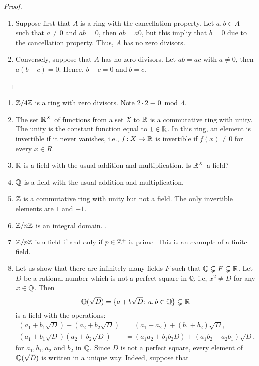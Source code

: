 \documentclass[11pt,a4paper]{article}
\begin{document}
\begin{proof}
\begin{enumerate}[label=(\roman*)]
\item Suppose first that $A$ is a ring with the cancellation property. Let $a,b\in A$ such that $a\neq 0$ and $ab=0$, then $ab=a0$, but this impliy that $b=0$ due to the cancellation property. Thus, $A$ has no zero divisors.
\item Conversely, suppose that $A$ has no zero divisors. Let $ab=ac$ with $a\neq0$, then $a(b-c)=0$. Hence, $b-c=0$ and $b=c$.
\end{enumerate}
\end{proof}
  

\begin{exa}
\begin{enumerate}[label=(\roman*)]
\item \(\mathbb{Z}/4\mathbb{Z}\) is a ring with zero divisors. Note  \(2\cdot 2 \equiv 0 \bmod 4 \). 
\item The set \(\mathbb{R}^X\) of   functions from a set \(X\) to \(\mathbb{R}\) is a commutative ring with unity. The unity is the constant function equal to \(1\in \mathbb{R}\). In this ring, an element is invertible if it never vanishes, i.e., \(f\colon X\to\mathbb{R}\) is invertible if \(f(x)\neq 0\) for every \(x\in R\).
\item \(\mathbb{R}\) is a field with the usual addition and multiplication. Is \(\mathbb{R}^X\) a field?
\item \(\mathbb{Q}\) is a field with the usual addition and multiplication.
\item \(\mathbb{Z}\) is a commutative ring with unity but not a field. The only invertible elements are $1$ and $-1$.
\item \(\mathbb{Z}/n\mathbb{Z}\) is an integral domain. .
\item \(\mathbb{Z}/p\mathbb{Z}\) is a field if and only if \(p\in \mathbb{Z}^+\) is prime. This is an example of a finite field. 
\item Let us show that there are infinitely many  fields \(F\) such that \(\mathbb{Q}\subsetneq F\subsetneq \mathbb{R}\). Let $D$ be a rational number which is not a perfect square in $\mathbb{Q}$, i.e, \(x^2 \neq D\) for any \(x\in \mathbb{Q}\). Then 
\[\mathbb{Q}(\sqrt{D})=\{a+b\sqrt{D}\colon a,b\in \mathbb{Q}\}\subsetneq \mathbb{R}\]
is a field with the operations:
\begin{align*}
(a_1+b_1\sqrt{D})+(a_2+b_2\sqrt{D})&=(a_1+a_2)+(b_1+b_2)\sqrt{D},\\
(a_1+b_1\sqrt{D})(a_2+b_2\sqrt{D})&=(a_1a_2+b_1b_2D)+(a_1b_2+a_2b_1)\sqrt{D},
\end{align*} 
for $a_1,b_1,a_2$ and $b_2$ in $\mathbb{Q}.$  Since $D$ is not a perfect square, every element of $\mathbb{Q}(\sqrt{D})$ is written in a unique way. Indeed,  suppose that 

\end{enumerate}
\end{exa}
\end{document}
